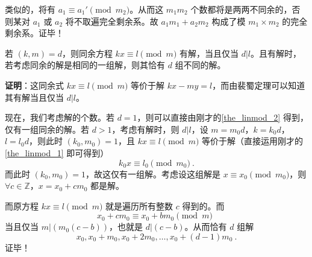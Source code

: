 类似的，将有 $a_1 \equiv a_1' \pmod{m_2}$。从而这 $m_1m_2$ 个数都将是两两不同余的，否则某对 $a_1$ 或 $a_2$ 将不取遍完全剩余系。故 $a_1m_1+a_2m_2$ 构成了模 $m_1\times m_2$ 的完全剩余系。证毕！


\begin{theorem}{}
若 $(k, m) = d$，则同余方程 $kx \equiv l \pmod m$ 有解，当且仅当 $d | l$。且有解时，若考虑同余的解是相同的一组解，则其恰有 $d$ 组不同的解。
\end{theorem}
\textbf{证明}：这同余式 $kx \equiv l \pmod m$ 等价于解 $kx - my = l$，而由裴蜀定理可以知道其有解当且仅当 $d | l$。

现在，我们考虑解的个数。若 $d=1$，则可以直接由刚才的\autoref{the_linmod_2} 得到，仅有一组同余的解。若 $d > 1$，考虑有解时，则 $d|l$，设 $m = m_0 d$，$k = k_0 d$，$l = l_0 d$，则此时 $(k_0, m_0) = 1$，且 $kx \equiv l \pmod m$ 等价于解（直接运用刚才的\autoref{the_linmod_1} 即可得到）
\begin{equation}
k_0 x \equiv l_0 \pmod {m_0} ~.
\end{equation}
而此时 $(k_0, m_0) = 1$，故这仅有一组解。考虑设这组解是 $x \equiv x_0 \pmod {m_0}$，则 $\forall c \in \mathbb Z$，$x = x_0 + c m_0$ 都是解。

而原方程 $kx \equiv l \pmod m$ 就是遍历所有整数 $c$ 得到的。而
\begin{equation}
x_0 + c m_0 \equiv x_0 + b m_0 \pmod m ~~
\end{equation}
当且仅当 $m | (m_0 (c - b))$，也就是 $d | (c - b)$。从而恰有 $d$ 组解
\begin{equation}
x_0, x_0 + m_0, x_0 + 2 m_0, \dots, x_0 + (d-1) m_0 ~.
\end{equation}
证毕！